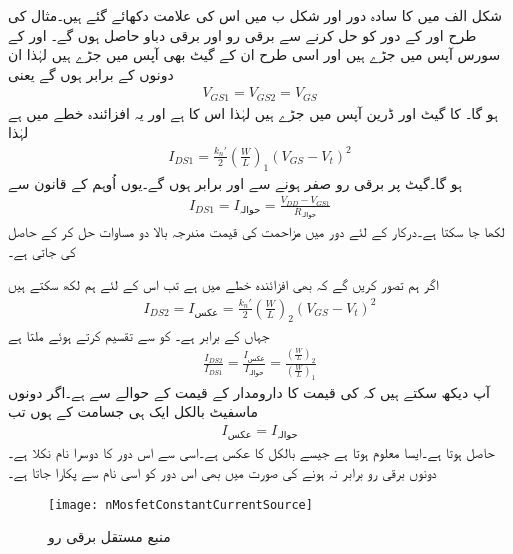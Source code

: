 شکل  الف میں  کا سادہ دور اور شکل  ب میں اس کی علامت دکھائے گئے ہیں۔مثال  کی طرح  اور  کے دور کو حل کرنے سے برقی رو  اور برقی دباو  حاصل ہوں گے۔ اور  کے سورس آپس میں جڑے ہیں اور اسی طرح ان کے گیٹ بھی آپس میں جڑے ہیں لہٰذا ان دونوں کے  برابر ہوں گے یعنی
\begin{align*}
V_{GS1}=V_{GS2}=V_{GS}
\end{align*}
ہو گا۔ کا گیٹ اور ڈرین آپس میں جڑے ہیں لہٰذا اس کا  ہے اور یہ افزائندہ خطے میں ہے لہٰذا
\begin{align}\label{مساوات_ماسفیٹ_مستقل_برقی_رو_الف}
I_{DS1}=\frac{k_n'}{2} \left(\frac{W}{L}\right)_1 \left(V_{GS}-V_t \right)^2
\end{align}
ہو گا۔گیٹ پر برقی رو صفر ہونے سے  اور  برابر ہوں گے۔یوں اُوہم کے قانون سے
\begin{align}\label{مساوات_ماسفیٹ_مستقل_برقی_رو_ب}
I_{DS1}=I_{\textrm{حوالہ}}=\frac{V_{DD}-V_{GS1}}{R_{\textrm{حوالہ}}}
\end{align}
لکھا جا سکتا ہے۔درکار  کے لئے دور میں مزاحمت  کی قیمت مندرجہ بالا دو مساوات حل کر کے  حاصل کی جاتی ہے۔

اگر ہم تصور کریں گے کہ  بھی افزائندہ خطے میں ہے تب اس کے لئے ہم لکھ سکتے ہیں
\begin{align}
I_{DS2}=I_{\textrm{عکس}}=\frac{k_n'}{2} \left(\frac{W}{L}\right)_2 \left(V_{GS}-V_t \right)^2
\end{align} 
جہاں  کے برابر ہے۔ کو  سے تقسیم کرتے ہوئے ملتا ہے
\begin{align}
\frac{I_{DS2}}{I_{DS1}}=\frac{I_{\textrm{عکس}}}{I_{\textrm{حوالہ}}}=\frac{\left(\frac{W}{L} \right)_2}{\left(\frac{W}{L} \right)_1}
\end{align}
آپ دیکھ سکتے ہیں کہ  کی قیمت کا دارومدار  کے قیمت کے حوالے سے ہے۔اگر دونوں ماسفیٹ بالکل ایک ہی جسامت کے ہوں تب
\begin{align}
I_{\textrm{عکس}}=I_{\textrm{حوالہ}}
\end{align}
حاصل ہوتا ہے۔ایسا معلوم ہوتا ہے جیسے  بالکل  کا عکس ہے۔اسی سے اس دور کا دوسرا نام  نکلا ہے۔دونوں برقی رو برابر نہ ہونے کی صورت میں بھی اس دور کو اسی نام سے پکارا جاتا ہے۔
\begin{figure}
\centering
\texttt{[image: nMosfetConstantCurrentSource]}
\caption{منبع مستقل برقی رو}
\label{شکل_ماسفیٹ_پیداکار_مستقل_برقی_رو}
\end{figure}

